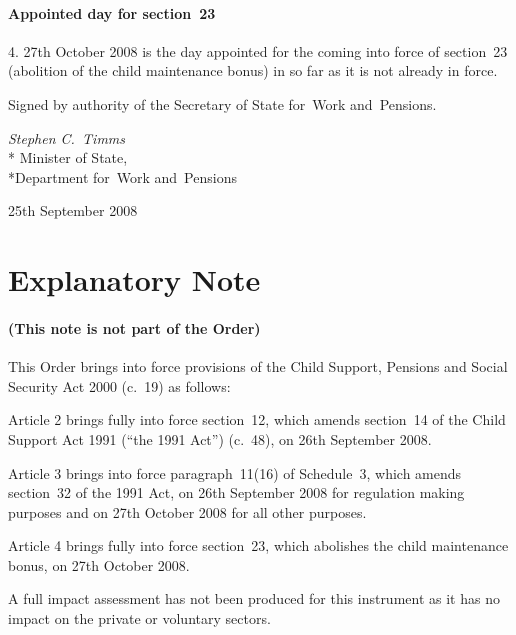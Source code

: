 \documentclass[12pt,a4paper]{article}
\begin{document}
\subsection[4. Appointed day for section~23]{Appointed day for section~23}

4.  27th October 2008 is the day appointed for the coming into force of section~23 (abolition of the child maintenance bonus) in so far as it is not already in force. 

\bigskip

Signed 
by authority of the 
Secretary of State for~Work and~Pensions.

{\raggedleft
\emph{Stephen C.~Timms}\\*
Minister
of State,\\*Department for~Work and~Pensions

}

25th September 2008

\small

\part{Explanatory Note}

\renewcommand\parthead{— Explanatory Note}

\subsection*{(This note is not part of the Order)}

This Order brings into force provisions of the Child Support, Pensions and Social Security Act 2000 (c.~19) as follows:

Article 2 brings fully into force section~12, which amends section~14 of the Child Support Act 1991 (“the 1991 Act”) (c.~48), on 26th September 2008.

Article 3 brings into force paragraph~11(16) of Schedule~3, which amends section~32 of the 1991 Act, on 26th September 2008 for regulation making purposes and on 27th October 2008 for all other purposes.

Article 4 brings fully into force section~23, which abolishes the child maintenance bonus, on 27th October 2008.

A full impact assessment has not been produced for this instrument as it has no impact on the private or voluntary sectors. 
\end{document}

